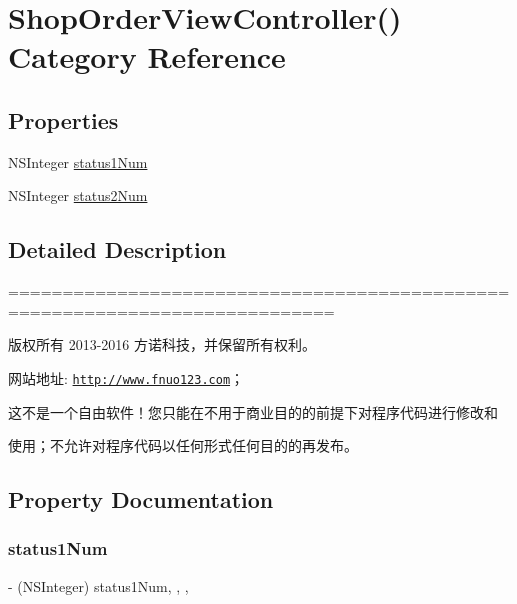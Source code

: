\hypertarget{category_shop_order_view_controller_07_08}{}\section{Shop\+Order\+View\+Controller() Category Reference}
\label{category_shop_order_view_controller_07_08}
\subsection*{Properties}
\begin{DoxyCompactItemize}
\item 
N\+S\+Integer \mbox{\hyperlink{category_shop_order_view_controller_07_08_a5546e840987e26bec852695361a1ea07}{status1\+Num}}
\item 
N\+S\+Integer \mbox{\hyperlink{category_shop_order_view_controller_07_08_a478fff73f8202148fcfb249b17104c5f}{status2\+Num}}
\end{DoxyCompactItemize}


\subsection{Detailed Description}
============================================================================

版权所有 2013-\/2016 方诺科技，并保留所有权利。

网站地址\+: \href{http://www.fnuo123.com}{\tt http\+://www.\+fnuo123.\+com}； 



这不是一个自由软件！您只能在不用于商业目的的前提下对程序代码进行修改和

使用；不允许对程序代码以任何形式任何目的的再发布。 

 

\subsection{Property Documentation}
\mbox{\label{category_shop_order_view_controller_07_08_a5546e840987e26bec852695361a1ea07}} 
\subsubsection{\texorpdfstring{status1\+Num}{status1Num}}
{\footnotesize\ttfamily -\/ (N\+S\+Integer) status1\+Num\hspace{0.3cm}{\ttfamily [read]}, {\ttfamily [write]}, {\ttfamily [nonatomic]}, {\ttfamily [assign]}}

